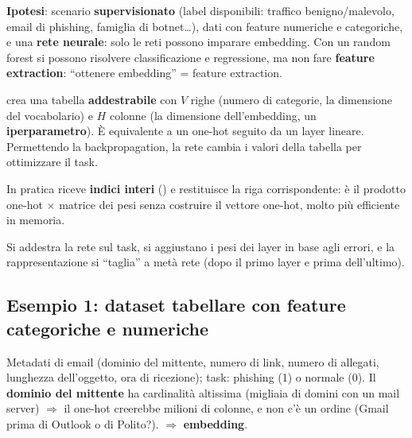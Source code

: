 \textbf{Ipotesi}: scenario \textbf{supervisionato} (label disponibili: traffico benigno/malevolo, email di phishing, famiglia di botnet\ldots),
dati con feature numeriche e categoriche, e una \textbf{rete neurale}: solo le reti possono imparare embedding. Con un random forest si possono
risolvere classificazione e regressione, ma non fare \textbf{feature extraction}: ``ottenere embedding'' = feature extraction.

\begin{definizione}
 crea una tabella \textbf{addestrabile} con $V$ righe (numero di categorie, la dimensione del vocabolario) e
$H$ colonne (la dimensione dell'embedding, un \textbf{iperparametro}). È equivalente a un one-hot seguito da un layer lineare. Permettendo la
backpropagation, la rete cambia i valori della tabella per ottimizzare il task.
\end{definizione}
\begin{integrazione}
In pratica  riceve \textbf{indici interi} () e restituisce la riga corrispondente: è il prodotto one-hot
$\times$ matrice dei pesi senza costruire il vettore one-hot, molto più efficiente in memoria.
\end{integrazione}
Si addestra la rete sul task, si aggiustano i pesi dei layer in base agli errori, e la rappresentazione si ``taglia'' a metà rete (dopo il primo
layer e prima dell'ultimo).

\subsection{Esempio 1: dataset tabellare con feature categoriche e numeriche}
Metadati di email (dominio del mittente, numero di link, numero di allegati, lunghezza dell'oggetto, ora di ricezione); task: phishing (1)
o normale (0). Il \textbf{dominio del mittente} ha cardinalità altissima (migliaia di domini con un mail server) $\Rightarrow$ il one-hot creerebbe
milioni di colonne, e non c'è un ordine (Gmail prima di Outlook o di Polito?). $\Rightarrow$ \textbf{embedding}.

